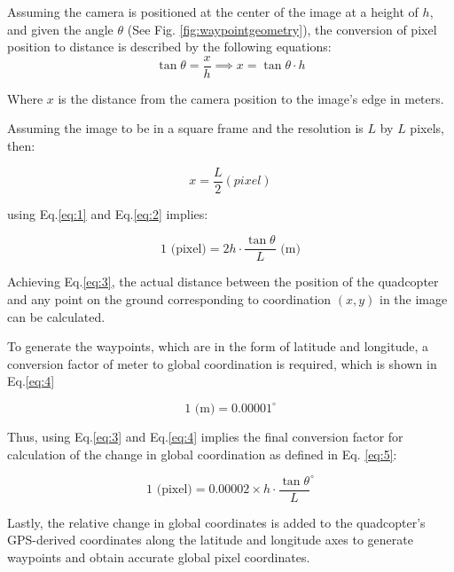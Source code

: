 \documentclass[conference]{IEEEtran}
\begin{document}
	Assuming the camera is positioned at the center of the image at a height of \( h \), and given the angle \( \theta \) (See Fig. \ref{fig:waypointgeometry}), the conversion of pixel position to distance is described by the following equations:
	\begin{equation}
		\tan \theta = \frac{x}{h} \implies x = \tan \theta  \cdot h
		\label{eq:1}
	\end{equation}
	
	Where \( x \) is the distance from the camera position to the image's edge in meters.
	
	Assuming the image to be in a square frame and the resolution is \( L \) by \( L \) pixels, then:
	
	\begin{equation}
		{x}=\frac{L}{2}\left(pixel\right)
		\label{eq:2}
	\end{equation}
	
	using Eq.\ref{eq:1} and Eq.\ref{eq:2} implies:
	
	\begin{equation}
		1 \text{ (pixel)} = 2h \cdot \frac{\tan \theta}{L} \text{ (m)}
		\label{eq:3}
	\end{equation}
	
	
	Achieving Eq.\ref{eq:3}, the actual distance between the position of the quadcopter and any point on the ground corresponding to coordination \((x, y)\) in the image can be calculated. 
	
	To generate the waypoints, which are in the form of latitude and longitude, a conversion factor of meter to global coordination is required, which is shown in Eq.\ref{eq:4} 
	
	\begin{equation}
		1 \text{ (m)} = 0.00001^\circ
		\label{eq:4}
	\end{equation}
	
	Thus, using Eq.\ref{eq:3} and Eq.\ref{eq:4} implies the final conversion factor for calculation of the change in global coordination as defined in Eq. \ref{eq:5}:
	
	\begin{equation}
		1 \text{ (pixel)} = 0.00002 \times h \cdot \frac{\tan \theta}{L}^\circ
		\label{eq:5}
	\end{equation}
	
	Lastly, the relative change in global coordinates is added to the quadcopter's GPS-derived coordinates along the latitude and longitude axes to generate waypoints and obtain accurate global pixel coordinates.
	
\end{document}
